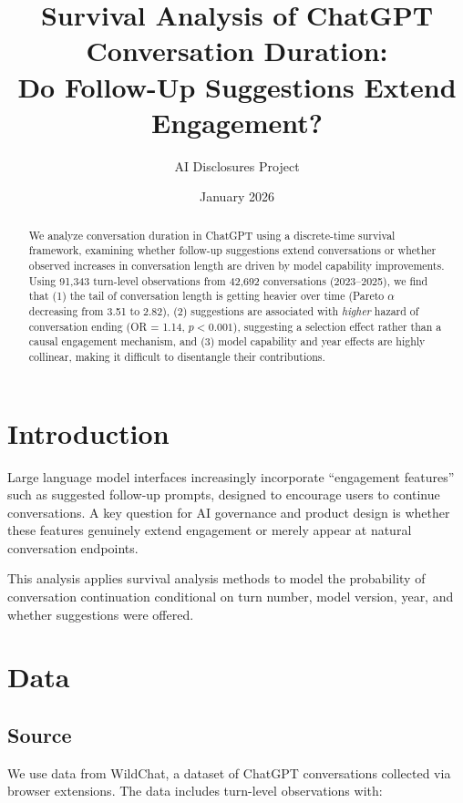 \documentclass[11pt]{article}
\title{Survival Analysis of ChatGPT Conversation Duration:\\
Do Follow-Up Suggestions Extend Engagement?}
\author{AI Disclosures Project}
\date{January 2026}
\begin{document}
\maketitle

\begin{abstract}
We analyze conversation duration in ChatGPT using a discrete-time survival framework, examining whether follow-up suggestions extend conversations or whether observed increases in conversation length are driven by model capability improvements. Using 91,343 turn-level observations from 42,692 conversations (2023--2025), we find that (1) the tail of conversation length is getting heavier over time (Pareto $\alpha$ decreasing from 3.51 to 2.82), (2) suggestions are associated with \textit{higher} hazard of conversation ending (OR = 1.14, $p < 0.001$), suggesting a selection effect rather than a causal engagement mechanism, and (3) model capability and year effects are highly collinear, making it difficult to disentangle their contributions.
\end{abstract}

\section{Introduction}

Large language model interfaces increasingly incorporate ``engagement features'' such as suggested follow-up prompts, designed to encourage users to continue conversations. A key question for AI governance and product design is whether these features genuinely extend engagement or merely appear at natural conversation endpoints.

This analysis applies survival analysis methods to model the probability of conversation continuation conditional on turn number, model version, year, and whether suggestions were offered.

\section{Data}

\subsection{Source}

We use data from WildChat, a dataset of ChatGPT conversations collected via browser extensions. The data includes turn-level observations with:
\end{document}
